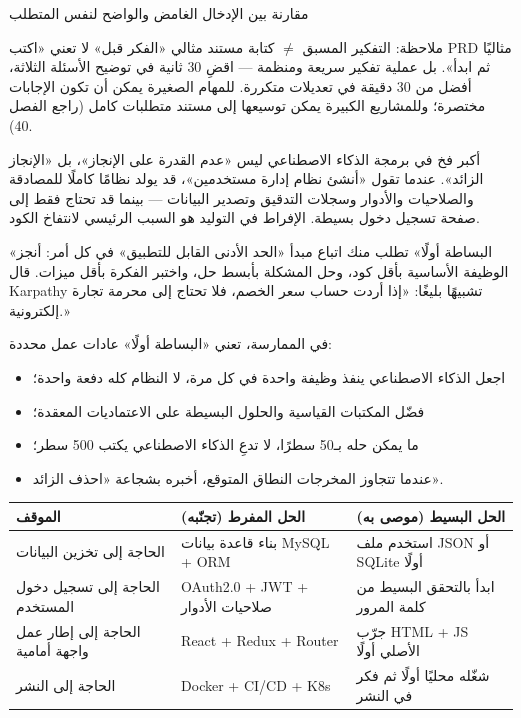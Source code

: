 \begin{center}\small\color{gray}مقارنة بين الإدخال الغامض والواضح لنفس المتطلب\end{center}

\begin{tcbwarn}{ملاحظة: التفكير المسبق $\neq$ كتابة مستند مثالي}
«الفكر قبل» لا تعني «اكتب PRD مثاليًا ثم ابدأ». بل عملية تفكير سريعة ومنظمة — اقضِ 30 ثانية في توضيح الأسئلة الثلاثة، أفضل من 30 دقيقة في تعديلات متكررة. للمهام الصغيرة يمكن أن تكون الإجابات مختصرة؛ وللمشاريع الكبيرة يمكن توسيعها إلى مستند متطلبات كامل (راجع الفصل 40).

\end{tcbwarn}


أكبر فخ في برمجة الذكاء الاصطناعي ليس «عدم القدرة على الإنجاز»، بل «الإنجاز الزائد». عندما تقول «أنشئ نظام إدارة مستخدمين»، قد يولد نظامًا كاملًا للمصادقة والصلاحيات والأدوار وسجلات التدقيق وتصدير البيانات — بينما قد تحتاج فقط إلى صفحة تسجيل دخول بسيطة. الإفراط في التوليد هو السبب الرئيسي لانتفاخ الكود.

«البساطة أولًا» تطلب منك اتباع مبدأ «الحد الأدنى القابل للتطبيق» في كل أمر: أنجز الوظيفة الأساسية بأقل كود، وحل المشكلة بأبسط حل، واختبر الفكرة بأقل ميزات. قال Karpathy تشبيهًا بليغًا: «إذا أردت حساب سعر الخصم، فلا تحتاج إلى محرمة تجارة إلكترونية.»

في الممارسة، تعني «البساطة أولًا» عادات عمل محددة:

\begin{itemize}
  \item اجعل الذكاء الاصطناعي ينفذ وظيفة واحدة في كل مرة، لا النظام كله دفعة واحدة؛
  \item فضّل المكتبات القياسية والحلول البسيطة على الاعتماديات المعقدة؛
  \item ما يمكن حله بـ50 سطرًا، لا تدعِ الذكاء الاصطناعي يكتب 500 سطر؛
  \item عندما تتجاوز المخرجات النطاق المتوقع، أخبره بشجاعة «احذف الزائد».
\end{itemize}

\begin{center}
\begin{tabularx}{\linewidth}{|X|X|X|}
\hline
\textbf{الموقف} & \textbf{الحل المفرط (تجنّبه)} & \textbf{الحل البسيط (موصى به)} \tabularnewline
\hline
الحاجة إلى تخزين البيانات & بناء قاعدة بيانات MySQL + ORM & استخدم ملف JSON أو SQLite أولًا \tabularnewline
الحاجة إلى تسجيل دخول المستخدم & OAuth2.0 + JWT + صلاحيات الأدوار & ابدأ بالتحقق البسيط من كلمة المرور \tabularnewline
الحاجة إلى إطار عمل واجهة أمامية & React + Redux + Router & جرّب HTML + JS الأصلي أولًا \tabularnewline
الحاجة إلى النشر & Docker + CI/CD + K8s & شغّله محليًا أولًا ثم فكر في النشر \tabularnewline
\hline
\end{tabularx}
\end{center}

